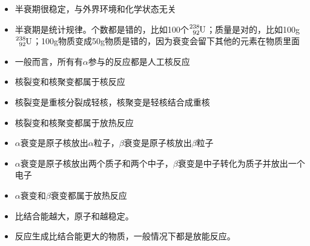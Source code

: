 \documentclass{cheatsheet}
\begin{document}
\begin{itemize}
	\item 半衰期很稳定，与外界环境和化学状态无关
	\item 半衰期是统计规律。个数都是错的，比如100个$\ce{^238_92U}$；质量是对的，比如100g$\ce{^238_92U}$；100g物质变成50g物质是错的，因为衰变会留下其他的元素在物质里面
	\item 一般而言，所有有$\alpha$参与的反应都是人工核反应
	\item 核裂变和核聚变都属于核反应
	\item 核裂变是重核分裂成轻核，核聚变是轻核结合成重核
	\item 核裂变和核聚变都属于放热反应
	\item $\alpha$衰变是原子核放出$\alpha$粒子，$\beta$衰变是原子核放出$\beta$粒子
	\item $\alpha$衰变是原子核放出两个质子和两个中子，$\beta$衰变是中子转化为质子并放出一个电子
	\item $\alpha$衰变和$\beta$衰变都属于放热反应
	\item 比结合能越大，原子和越稳定。
	\item 反应生成比结合能更大的物质，一般情况下都是放能反应。
\end{itemize}
\end{document}
